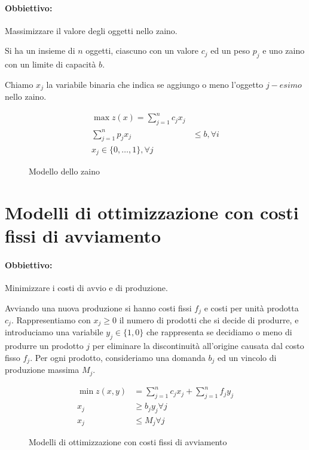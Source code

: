 \documentclass[\main/main.tex]{subfiles}
\begin{document}
\paragraph*{Obbiettivo:} Massimizzare il valore degli oggetti nello zaino.

Si ha un insieme di $n$ oggetti, ciascuno con un valore $c_j$ ed un peso $p_j$ e uno zaino con un limite di capacità $b.$

Chiamo $x_j$ la variabile binaria che indica se aggiungo o meno l'oggetto $j-esimo$ nello zaino.

\begin{figure}
  \begin{align*}
    \max z(x) = \sum_{j=1}^n c_jx_j           \\
    \sum_{j=1}^n p_{j}x_j & \leq b, \forall i \\
    x_j \in \{0,\ldots,1\}, \forall j
  \end{align*}
  \caption{Modello dello zaino}
\end{figure}

\section{Modelli di ottimizzazione con costi fissi di avviamento}
\paragraph*{Obbiettivo:} Minimizzare i costi di avvio e di produzione.

Avviando una nuova produzione si hanno costi fissi $f_j$ e costi per unità prodotta $c_j$. Rappresentiamo con $x_j\geq0$ il numero di prodotti che si decide di produrre, e introduciamo una variabile $y_j \in \{1,0\}$ che rappresenta se decidiamo o meno di produrre un prodotto $j$ per eliminare la discontinuità all'origine causata dal costo fisso $f_j$. Per ogni prodotto, consideriamo una domanda $b_j$ ed un vincolo di produzione massima $M_j$.

\begin{figure}
  \begin{align*}
    \min z(x,y) & = \sum_{j=1}^n c_jx_j + \sum_{j=1}^n f_jy_j \\
    x_j         & \geq b_j y_j \forall j                    \\
    x_j         & \leq M_j \forall j
  \end{align*}
  \caption{Modelli di ottimizzazione con costi fissi di avviamento}
\end{figure}
\end{document}

